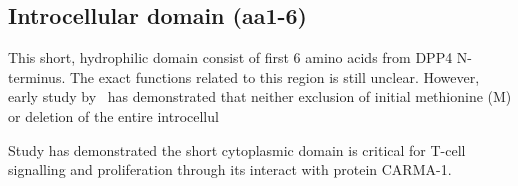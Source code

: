 \subsection{Introcellular domain (aa1-6)}

This short, hydrophilic domain consist of first 6 amino acids from DPP4 N-terminus. The exact functions related to this region is still unclear. However, early study by~\citet{Hong1990} has demonstrated that neither exclusion of initial methionine (M) or deletion of the entire introcellul

Study has demonstrated the short cytoplasmic domain is critical for T-cell signalling and proliferation through its interact with protein CARMA-1. \cite{Ohnuma_2007}